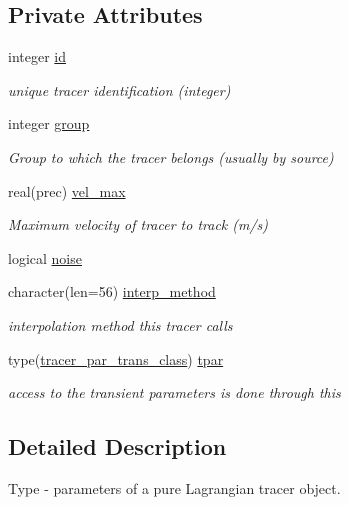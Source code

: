 \subsection*{Private Attributes}
\begin{DoxyCompactItemize}
\item 
integer \mbox{\hyperlink{structtracer3d_1_1tracer__par__class_a1f29e5b901901a35bd42062f5d08f1c1}{id}}
\begin{DoxyCompactList}\small\item\em unique tracer identification (integer) \end{DoxyCompactList}\item 
integer \mbox{\hyperlink{structtracer3d_1_1tracer__par__class_a8afb7d62372c07fb202941fccca2cc38}{group}}
\begin{DoxyCompactList}\small\item\em Group to which the tracer belongs (usually by source) \end{DoxyCompactList}\item 
real(prec) \mbox{\hyperlink{structtracer3d_1_1tracer__par__class_a25440b3bfbbc78ea434761725f1f3b4a}{vel\+\_\+max}}
\begin{DoxyCompactList}\small\item\em Maximum velocity of tracer to track (m/s) \end{DoxyCompactList}\item 
logical \mbox{\hyperlink{structtracer3d_1_1tracer__par__class_af258b7ca349ce911511dbd89b24606f7}{noise}}
\item 
character(len=56) \mbox{\hyperlink{structtracer3d_1_1tracer__par__class_a33c8edd729f2f4c19571ee04368be4e0}{interp\+\_\+method}}
\begin{DoxyCompactList}\small\item\em interpolation method this tracer calls \end{DoxyCompactList}\item 
type(\mbox{\hyperlink{structtracer3d_1_1tracer__par__trans__class}{tracer\+\_\+par\+\_\+trans\+\_\+class}}) \mbox{\hyperlink{structtracer3d_1_1tracer__par__class_a4486f0959101435f0fdeb1c845d4bbf4}{tpar}}
\begin{DoxyCompactList}\small\item\em access to the transient parameters is done through this \end{DoxyCompactList}\end{DoxyCompactItemize}


\subsection{Detailed Description}
Type -\/ parameters of a pure Lagrangian tracer object. 

